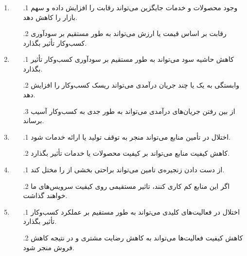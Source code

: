 \documentclass[dvipsnames, svgnames, x11names, 11pt]{article}
\begin{document}
\subsubsection{}
\begin{enumerate}
\item {}
\begin{itemize}
\item[\theenumi$.$1]
وجود محصولات و خدمات جایگزین می‌تواند رقابت را افزایش داده و سهم بازار را کاهش دهد.

\item[\theenumi$.$2]
رقابت بر اساس قیمت یا ارزش می‌تواند به طور مستقیم بر سودآوری کسب‌وکار تأثیر بگذارد.
\end{itemize}

\item {}
\begin{itemize}
\item[\theenumi$.$1]
کاهش حاشیه سود می‌تواند به طور مستقیم بر سودآوری کسب‌وکار تأثیر بگذارد.

\item[\theenumi$.$2]
وابستگی به یک یا چند جریان درآمدی می‌تواند ریسک کسب‌وکار را افزایش دهد.

\item[\theenumi$.$3]
از بین رفتن جریان‌های درآمدی می‌تواند به طور جدی به کسب‌وکار آسیب برساند.
\end{itemize}

\item {}
\begin{itemize}
\item[\theenumi$.$1]
اختلال در تأمین منابع می‌تواند منجر به توقف تولید یا ارائه خدمات شود.

\item[\theenumi$.$2]
کاهش کیفیت منابع می‌تواند بر کیفیت محصولات یا خدمات تأثیر بگذارد.
\end{itemize}

\item {}
\begin{itemize}
\item[\theenumi$.$1]
از دست دادن زنجیره‌ی تامین می‌تواند براحتی بخشی از 
را مختل کند.
\item[\theenumi$.$2]
اگر این منابع کم کاری کنند، تاثیر مستقیمی روی کیفیت سرویس‌های ما خواهند گذاشت.
\end{itemize}

\item {}
\begin{itemize}
\item[\theenumi$.$1]
اختلال در فعالیت‌های کلیدی می‌تواند به طور مستقیم بر عملکرد کسب‌وکار تأثیر بگذارد.
\item[\theenumi$.$2]
کاهش کیفیت فعالیت‌ها می‌تواند به کاهش رضایت مشتری و در نتیجه کاهش فروش منجر شود.
\end{itemize}


\end{enumerate}
\end{document}
